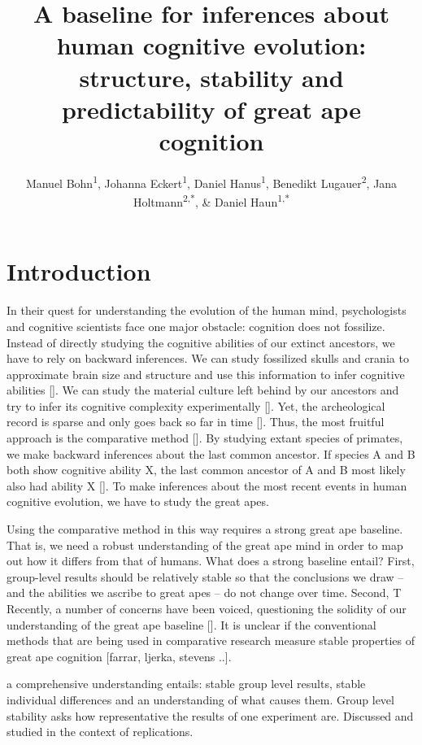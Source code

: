 \documentclass[
  man,floatsintext]{apa6}
\title{A baseline for inferences about human cognitive evolution: structure, stability and predictability of great ape cognition}
\author{Manuel Bohn\textsuperscript{1}, Johanna Eckert\textsuperscript{1}, Daniel Hanus\textsuperscript{1}, Benedikt Lugauer\textsuperscript{2}, Jana Holtmann\textsuperscript{2,*}, \& Daniel Haun\textsuperscript{1,*}}
\date{}
\affiliation{\vspace{0.5cm}\textsuperscript{1} Department of Comparative Cultural Psychology, Max Planck Institute for Evolutionary Anthropology, Leipzig, Germany\\\textsuperscript{2} Psychologische Hochschule Berlin, Berlin, Germany\\\textsuperscript{*} Shared senior authorship}
\begin{document}
\maketitle

\hypertarget{introduction}{%
\section{Introduction}\label{introduction}}

In their quest for understanding the evolution of the human mind, psychologists and cognitive scientists face one major obstacle: cognition does not fossilize. Instead of directly studying the cognitive abilities of our extinct ancestors, we have to rely on backward inferences. We can study fossilized skulls and crania to approximate brain size and structure and use this information to infer cognitive abilities {[}{]}. We can study the material culture left behind by our ancestors and try to infer its cognitive complexity experimentally {[}{]}. Yet, the archeological record is sparse and only goes back so far in time {[}{]}. Thus, the most fruitful approach is the comparative method {[}{]}. By studying extant species of primates, we make backward inferences about the last common ancestor. If species A and B both show cognitive ability X, the last common ancestor of A and B most likely also had ability X {[}{]}. To make inferences about the most recent events in human cognitive evolution, we have to study the great apes.

Using the comparative method in this way requires a strong great ape baseline. That is, we need a robust understanding of the great ape mind in order to map out how it differs from that of humans. What does a strong baseline entail? First, group-level results should be relatively stable so that the conclusions we draw -- and the abilities we ascribe to great apes -- do not change over time. Second, T Recently, a number of concerns have been voiced, questioning the solidity of our understanding of the great ape baseline {[}{]}. It is unclear if the conventional methods that are being used in comparative research measure stable properties of great ape cognition {[}farrar, ljerka, stevens ..{]}.

a comprehensive understanding entails: stable group level results, stable individual differences and an understanding of what causes them. Group level stability asks how representative the results of one experiment are. Discussed and studied in the context of replications.
\end{document}
